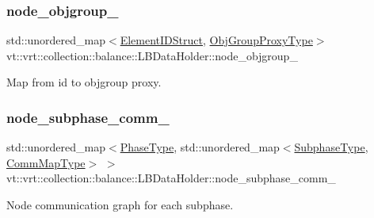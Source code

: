\subsubsection{\texorpdfstring{node\+\_\+objgroup\+\_\+}{node\_objgroup\_}}
{\footnotesize\ttfamily std\+::unordered\+\_\+map$<$\hyperlink{namespacevt_1_1vrt_1_1collection_1_1balance_a9f5b53fafb270212279a4757d2c4cd28}{Element\+I\+D\+Struct}, \hyperlink{namespacevt_ad7cae989df485fccca57f0792a880a8e}{Obj\+Group\+Proxy\+Type}$>$ vt\+::vrt\+::collection\+::balance\+::\+L\+B\+Data\+Holder\+::node\+\_\+objgroup\+\_\+}



Map from id to objgroup proxy. 

\mbox{\label{structvt_1_1vrt_1_1collection_1_1balance_1_1_l_b_data_holder_a733c6d7b9fb2bb0c67588eed9b9cd5fc}} 
\subsubsection{\texorpdfstring{node\+\_\+subphase\+\_\+comm\+\_\+}{node\_subphase\_comm\_}}
{\footnotesize\ttfamily std\+::unordered\+\_\+map$<$\hyperlink{namespacevt_a46ce6733d5cdbd735d561b7b4029f6d7}{Phase\+Type}, std\+::unordered\+\_\+map$<$\hyperlink{namespacevt_ae78cbfdf1e57470e33eedb074f2beeba}{Subphase\+Type}, \hyperlink{namespacevt_1_1vrt_1_1collection_1_1balance_a01ee1fb0ae2da1d2ab7fdca3be9ae351}{Comm\+Map\+Type}$>$ $>$ vt\+::vrt\+::collection\+::balance\+::\+L\+B\+Data\+Holder\+::node\+\_\+subphase\+\_\+comm\+\_\+}



Node communication graph for each subphase. 

\mbox{\label{structvt_1_1vrt_1_1collection_1_1balance_1_1_l_b_data_holder_a66a5410c689d1515c9462495d3225a79}} 
